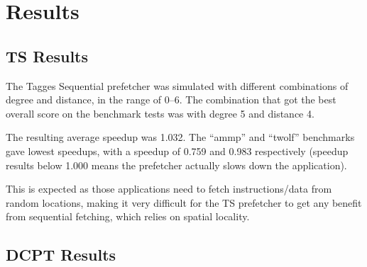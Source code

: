 \section{Results}

\subsection{TS Results}

The Tagges Sequential prefetcher was simulated with different combinations of
degree and distance, in the range of 0--6. The combination that got the best
overall score on the benchmark tests was with degree 5 and distance 4.

The resulting average speedup was 1.032. The ``ammp'' and ``twolf'' benchmarks
gave lowest speedups, with a speedup of 0.759 and 0.983 respectively (speedup
results below 1.000 means the prefetcher actually slows down the application).

This is expected as those applications need to fetch instructions/data from
random locations, making it very difficult for the TS prefetcher
to get any benefit from sequential fetching, which relies on spatial locality.

\subsection{DCPT Results}


